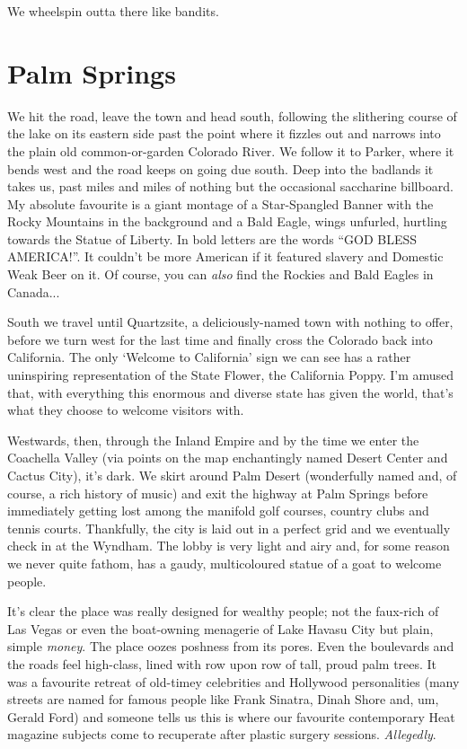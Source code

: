 \documentclass[a5paper,titlepage,11pt]{book}
\begin{document}
We wheelspin outta there like bandits.

\section*{Palm Springs}
We hit the road, leave the town and head south, following the slithering course of the lake on its eastern side past the point where it fizzles out and narrows into the plain old common-or-garden Colorado River. We follow it to Parker, where it bends west and the road keeps on going due south. Deep into the badlands it takes us, past miles and miles of nothing but the occasional saccharine billboard. My absolute favourite is a giant montage of a Star-Spangled Banner with the Rocky Mountains in the background and a Bald Eagle, wings unfurled, hurtling towards the Statue of Liberty. In bold letters are the words ``GOD BLESS AMERICA!''. It couldn't be more American if it featured slavery and Domestic Weak Beer on it. Of course, you can \emph{also} find the Rockies and Bald Eagles in Canada...

South we travel until Quartzsite, a deliciously-named town with nothing to offer, before we turn west for the last time and finally cross the Colorado back into California. The only `Welcome to California' sign we can see has a rather uninspiring representation of the State Flower, the California Poppy. I'm amused that, with everything this enormous and diverse state has given the world, that's what they choose to welcome visitors with.

Westwards, then, through the Inland Empire and by the time we enter the Coachella Valley (via points on the map enchantingly named Desert Center and Cactus City), it's dark. We skirt around Palm Desert (wonderfully named and, of course, a rich history of music) and exit the highway at Palm Springs before immediately getting lost among the manifold golf courses, country clubs and tennis courts. Thankfully, the city is laid out in a perfect grid and we eventually check in at the Wyndham. The lobby is very light and airy and, for some reason we never quite fathom, has a gaudy, multicoloured statue of a goat to welcome people.

It's clear the place was really designed for wealthy people; not the faux-rich of Las Vegas or even the boat-owning menagerie of Lake Havasu City but plain, simple \emph{money}. The place oozes poshness from its pores. Even the boulevards and the roads feel high-class, lined with row upon row of tall, proud palm trees. It was a favourite retreat of old-timey celebrities and Hollywood personalities (many streets are named for famous people like Frank Sinatra, Dinah Shore and, um, Gerald Ford) and someone tells us this is where our favourite contemporary Heat magazine subjects come to recuperate after plastic surgery sessions. \emph{Allegedly}.
\end{document}
